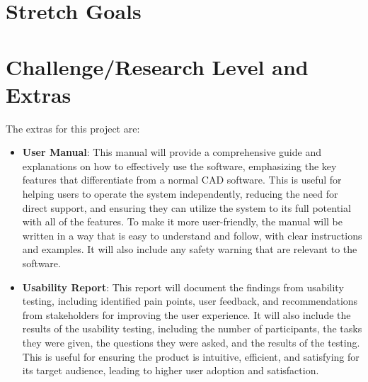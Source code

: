 \documentclass{article}
\begin{document}
\section{Stretch Goals}

\section{Challenge/Research Level and Extras}

%
%
The extras for this project are:

\begin{itemize}
    \item \textbf{User Manual}: This manual will provide a comprehensive guide and explanations on how to effectively use the software, emphasizing the key features that differentiate from a normal CAD software. This is useful for helping users to operate the system independently, reducing the need for direct support, and ensuring they can utilize the system to its full potential with all of the features. To make it more user-friendly, the manual will be written in a way that is easy to understand and follow, with clear instructions and examples. It will also include any safety warning that are relevant to the software.
    \item \textbf{Usability Report}: This report will document the findings from usability testing, including identified pain points, user feedback, and recommendations from stakeholders for improving the user experience. It will also include the results of the usability testing, including the number of participants, the tasks they were given, the questions they were asked, and the results of the testing. This is useful for ensuring the product is intuitive, efficient, and satisfying for its target audience, leading to higher user adoption and satisfaction.
\end{itemize}
\newpage{}
\end{document}
